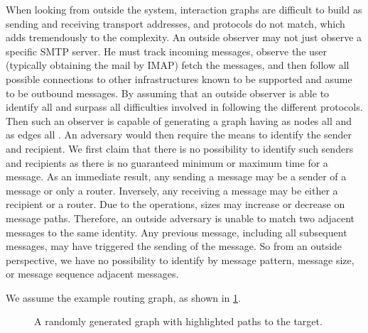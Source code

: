 When looking from outside the system, interaction graphs are difficult to build as sending and receiving transport addresses, and protocols do not match, which adds tremendously to the complexity. An outside observer may not just observe a specific SMTP server. He must track incoming messages, observe the user (typically obtaining the mail by IMAP) fetch the messages, and then follow all possible connections to other infrastructures known to be supported and asume to be outbound messages. By assuming that an outside observer is able to identify all \VortexMessages{} and surpass all difficulties involved in following the different protocols. Then such an observer is capable of generating a graph having as nodes all \VortexNodes{} and as edges all \VortexMessages{}. An adversary would then require the means to identify the sender and recipient. We first claim that there is no possibility to identify such senders and recipients as there is no guaranteed minimum or maximum time for a message. As an immediate result, any \VortexNode{} sending a message may be a sender of a message or only a router. Inversely, any \VortexNode{} receiving a message may be either a recipient or a router. Due to the operations, sizes may increase or decrease on message paths. Therefore, an outside adversary is unable to match two adjacent messages to the same identity. Any previous message, including all subsequent messages, may have triggered the sending of the message. So from an outside perspective, we have no possibility to identify by message pattern, message size, or message sequence adjacent messages.

We assume the example routing graph, as shown in \cref{fig:messageGraphPaths}.

\begin{figure}[!t]\centering
	\resizebox{.9\linewidth}{!}{
		
	}
	\caption{A randomly generated graph with highlighted paths to the target.}
	\label{fig:messageGraphPaths}
\end{figure}


